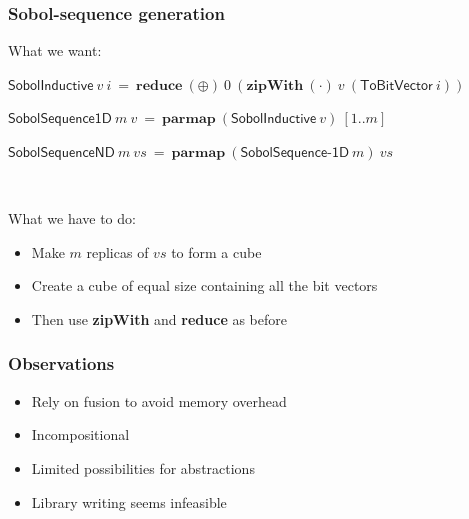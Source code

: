 \documentclass{beamer}
\begin{document}
\begin{frame}[fragile]
  \frametitle{Sobol-sequence generation}

What we want:

  \quad$\mathsf{SobolInductive}~v~i~=~\textbf{reduce}~(\oplus)~0~(\textbf{zipWith}~(\cdot)~v~(\textsf{ToBitVector}~i))$
  ~\vspace{2mm}\pause
  
  \quad$\mathsf{SobolSequence1D}~m~v~=~\textbf{parmap}~(\textsf{SobolInductive}~v)~[1..m]$
  ~\vspace{2mm}\pause

  \quad$\mathsf{SobolSequenceND}~m~vs~=~\textbf{parmap}~(\textsf{SobolSequence-1D}~m)~vs$

~\vspace{5mm}\pause

What we have to do:
\begin{itemize}
\item Make $m$ replicas of $vs$ to form a cube
\item Create a cube of equal size containing all the bit vectors
\item Then use \textbf{zipWith} and \textbf{reduce} as before
\end{itemize}
\end{frame}

\begin{frame}[fragile]
  \frametitle{Observations}

  \begin{itemize}
  \item<1-> Rely on fusion to avoid memory overhead
  \item<2-> Incompositional
  \item<3-> Limited possibilities for abstractions
  \item<4-> Library writing seems infeasible
  \end{itemize}
\end{frame}
\end{document}
